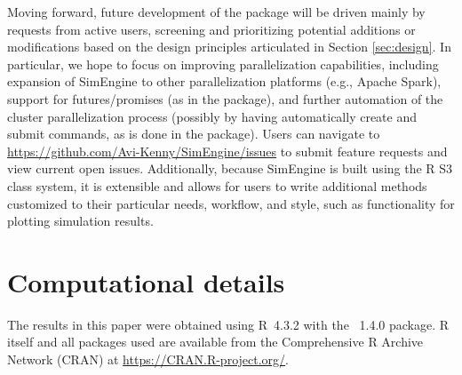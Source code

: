 Moving forward, future development of the package will be driven mainly by requests from active users, screening and prioritizing potential additions or modifications based on the design principles articulated in Section \ref{sec:design}. In particular, we hope to focus on improving parallelization capabilities, including expansion of SimEngine to other parallelization platforms (e.g., Apache Spark), support for futures/promises (as in the  package), and further automation of the cluster parallelization process (possibly by having  automatically create and submit  commands, as is done in the  package). Users can navigate to \url{https://github.com/Avi-Kenny/SimEngine/issues} to submit feature requests and view current open issues. Additionally, because SimEngine is built using the R S3 class system, it is extensible and allows for users to write additional methods customized to their particular needs, workflow, and style, such as functionality for plotting simulation results.

\section*{Computational details}

The results in this paper were obtained using R~4.3.2 with the ~1.4.0 package. R itself and all packages used are available from the Comprehensive R Archive Network (CRAN) at \url{https://CRAN.R-project.org/}.



\address{Avi Kenny\\
  Department of Biostatistics and Bioinformatics, Duke University\\
  Global Health Institute, Duke University\\
  2424 Erwin Rd\\
  Durham, NC 27710, USA\\
  ORCiD: 0000-0002-9465-7307\\
  }

\address{Charles J. Wolock\\
  Department of Biostatistics and Computational Biology\\
  University of Rochester\\
  265 Crittenden Boulevard,\\
  Rochester, New York 14642, USA\\
  ORCiD: 0000-0003-3527-1102\\
  }

